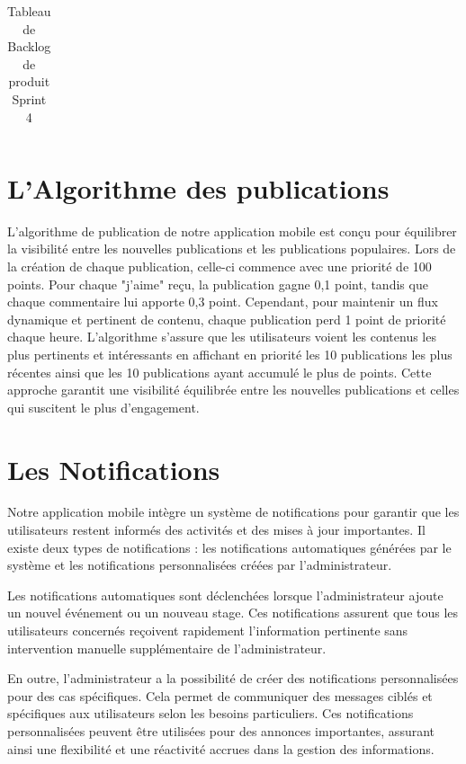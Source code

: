 \begin{sloppypar}
\begin{table}[h]
\begin{tabular}{|p{8cm}|p{3cm}|p{3cm}|}
\end{tabular}
\caption{Tableau de Backlog de produit Sprint 4}
\end{table}
\vspace{-1.2cm}

\section{L'Algorithme des publications}
\vspace{-4mm}
L'algorithme de publication de notre application mobile est conçu pour équilibrer la visibilité entre les nouvelles publications et les publications populaires. Lors de la création de chaque publication, celle-ci commence avec une priorité de 100 points. Pour chaque "j'aime" reçu, la publication gagne 0,1 point, tandis que chaque commentaire lui apporte 0,3 point. Cependant, pour maintenir un flux dynamique et pertinent de contenu, chaque publication perd 1 point de priorité chaque heure. L'algorithme s'assure que les utilisateurs voient les contenus les plus pertinents et intéressants en affichant en priorité les 10 publications les plus récentes ainsi que les 10 publications ayant accumulé le plus de points. Cette approche garantit une visibilité équilibrée entre les nouvelles publications et celles qui suscitent le plus d'engagement.
\vspace{-1cm}
\section{Les Notifications }
\vspace{-4mm}
Notre application mobile intègre un système de notifications pour garantir que les utilisateurs restent informés des activités et des mises à jour importantes. Il existe deux types de notifications : les notifications automatiques générées par le système et les notifications personnalisées créées par l'administrateur.

Les notifications automatiques sont déclenchées lorsque l'administrateur ajoute un nouvel événement ou un nouveau stage. Ces notifications assurent que tous les utilisateurs concernés reçoivent rapidement l'information pertinente sans intervention manuelle supplémentaire de l'administrateur.

En outre, l'administrateur a la possibilité de créer des notifications personnalisées pour des cas spécifiques. Cela permet de communiquer des messages ciblés et spécifiques aux utilisateurs selon les besoins particuliers. Ces notifications personnalisées peuvent être utilisées pour des annonces importantes, assurant ainsi une flexibilité et une réactivité accrues dans la gestion des informations.


\end{sloppypar}
